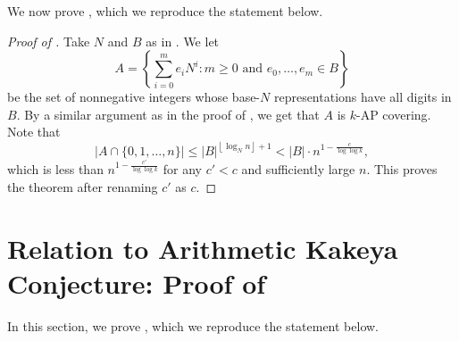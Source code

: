 \documentclass[11pt,reqno]{amsart}
\begin{document}
We now prove ,
which we reproduce the statement below.
\arithmetic*
\begin{proof}[Proof of ]
Take $N$ and $B$ as in .
We let 
$$A = \left\{\sum_{i=0}^m e_i N^i 
: m\geq 0 \text{ and }e_0,\dots,e_m\in B\right\}$$
be the set of nonnegative integers whose base-$N$
representations have all digits in $B$.
By a similar argument as in the proof of ,
we get that $A$ is $k$-AP covering.
Note that 
$$|A\cap \{0,1,\dots,n\}| 
\leq |B|^{\left\lfloor\log_N n\right\rfloor+1} 
< |B|\cdot  n^{1-\frac c{\log\log k}},$$
which is less than $n^{1-\frac{c'}{\log\log k}}$
for any $c'<c$ and sufficiently large $n$.
This proves the theorem after renaming $c'$ as $c$.
\end{proof}

\section{Relation to Arithmetic Kakeya Conjecture:
Proof of \texorpdfstring{}{Theorem \ref{thm:arithmetic_kakeya}}}
\label{sec:kakeya}
In this section, we prove ,
which we reproduce the statement below.

\kakeya*
\end{document}
